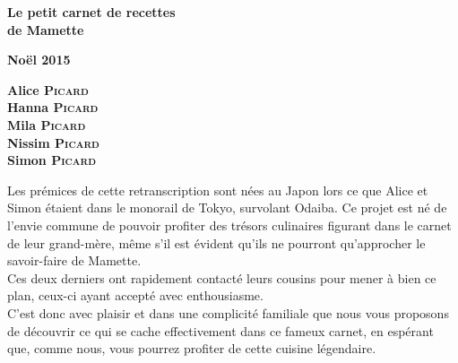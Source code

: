 \documentclass{C:/Users/Simon/Desktop/mamette/cuisine/recipe}
\begin{document}
\frontmatter
\pagestyle{empty}
\begin{titlepage}

\end{titlepage}

\begin{titlepage}
\parindent=0pt

\begin{center}\bfseries\Huge
    Le petit carnet de recettes\\de Mamette
\end{center}
\hrulefill
\vspace*{1cm}
\begin{center}\bfseries\Large
Noël 2015
\end{center}
    
\begin{center}\bfseries\Large
Alice \textsc{Picard}\\
Hanna \textsc{Picard}\\
Mila \textsc{Picard}\\
Nissim \textsc{Picard}\\
Simon \textsc{Picard}
\end{center}
\begin{flushright}
       
\end{flushright}   
\end{titlepage}
\cleardoublepage

\vspace*{\fill}
\begin{center}
Les prémices de cette retranscription sont nées au Japon lors ce que Alice et Simon étaient dans le monorail de Tokyo, survolant Odaiba. Ce projet est né de l'envie commune de pouvoir profiter des trésors culinaires figurant dans le carnet de leur grand-mère, même s'il est évident qu'ils ne pourront qu'approcher le savoir-faire de Mamette.\\
Ces deux derniers ont rapidement contacté leurs cousins pour mener à bien ce plan, ceux-ci ayant accepté avec enthousiasme.\\


C'est donc avec plaisir et dans une complicité familiale que nous vous proposons de découvrir ce qui se cache effectivement dans ce fameux carnet, en espérant que, comme nous, vous pourrez profiter de cette cuisine légendaire.
\end{center}
\vspace*{\fill}
\cleardoublepage
\end{document}
